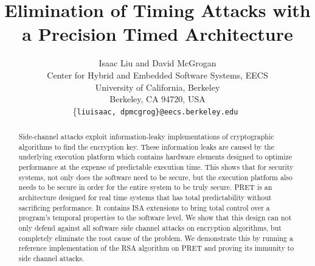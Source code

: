 \documentclass[times, 10pt,twocolumn]{article}
\begin{document}
  \title{Elimination of Timing Attacks with a Precision Timed Architecture}

  \author{Isaac Liu and David McGrogan \\
    Center for Hybrid and Embedded Software Systems, EECS \\
    University of California, Berkeley \\
    Berkeley, CA 94720, USA \\
    \{\tt liuisaac, dpmcgrog\}@eecs.berkeley.edu
  }


\maketitle
\thispagestyle{empty}

\begin{abstract}
Side-channel attacks exploit information-leaky implementations of cryptographic algorithms to find the encryption key. These information leaks are caused by the underlying execution platform which contains hardware elements designed to optimize performance at the expense of predictable execution time. This shows that for security systems, not only does the software need to be secure, but the execution platform also needs to be secure in order for the entire system to be truly secure. PRET is an architecture designed for real time systems that has total predictability without sacrificing performance. It contains ISA extensions to bring total control over a program's temporal properties to the software level. We show that this design can not only defend against all software side channel attacks on encryption algorithms, but completely eliminate the root cause of the problem. We demonstrate this by running a reference implementation of the RSA algorithm on PRET and proving its immunity to side channel attacks.
\end{abstract}


\end{document}
